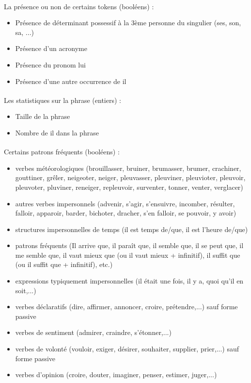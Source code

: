 \documentclass[a4paper,12pt]{article}
\begin{document}
\paragraph{}
\textbullet{} La présence ou non de certains tokens (booléens) :
 \begin{itemize}
  \item Présence de déterminant possessif à la 3ème personne du singulier (ses, son, sa, ...)
  \item Présence d'un acronyme
  \item Présence du pronom \og{}lui\fg{}
  \item Présence d'une autre occurrence de \og{}il\fg{}
 \end{itemize}
 
\paragraph{}
\textbullet{} Les statistiques sur la phrase (entiers) :
 \begin{itemize}
  \item Taille de la phrase
  \item Nombre de \og{}il\fg{} dans la phrase
 \end{itemize}

\paragraph{}
\textbullet{} Certains patrons fréquents (booléens) :
 \begin{itemize}
  \item verbes météorologiques (brouillasser, bruiner, brumasser, brumer, crachiner, gouttiner, grêler, neigeoter, neiger, pleuvasser, pleuviner, pleuvioter, pleuvoir, pleuvoter,  pluviner, reneiger, repleuvoir, surventer, tonner, venter, verglacer)
  \item autres verbes impersonnels (advenir, s'agir, s'ensuivre, incomber, résulter, falloir, apparoir, barder, bichoter, dracher, s'en falloir, se pouvoir, y avoir) \\
  \item structures impersonnelles de temps (il est temps de/que, il est l'heure de/que)
  \item patrons fréquents (Il arrive que, il paraît que, il semble que, il se peut que, il me semble que, il vaut mieux que (ou il vaut mieux + infinitif), il suffit que (ou il suffit que + infinitif), etc.)
  \item expressions typiquement impersonnelles (il était une fois, il y a, quoi qu'il en soit,...)
  \item verbes déclaratifs (dire, affirmer, annoncer, croire, prétendre,...) sauf forme passive
  \item verbes de sentiment (admirer, craindre, s'étonner,...)
  \item verbes de volonté (vouloir, exiger, désirer, souhaiter, supplier, prier,...) sauf forme passive
  \item verbes d'opinion (croire, douter, imaginer, penser, estimer, juger,...)
 \end{itemize}
\end{document}
